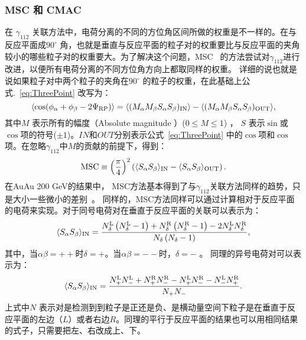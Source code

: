 \subsubsection{MSC 和 CMAC}
在 $\gamma_{112}$ 关联方法中，电荷分离的不同的方位角区间所做的权重是不一样的。在与反应平面成$90^\circ$ 角，也就是垂直与反应平面的粒子对的权重要比与反应平面的夹角较小的哪些粒子对的权重要大。为了解决这个问题，MSC~\cite{STAR3} 的方法尝试对$\gamma_{112}$进行改进，以便所有电荷分离的不同方位角方向上都取同样的权重。
详细的说也就是说如果粒子对中两个粒子的夹角在$90^\circ$ 的粒子的权重，在此基础上公式.~\ref{eq:ThreePoint} 改写为：
\begin{equation}
\langle \cos(\phi_{\alpha}+\phi_{\beta}-2{\rm \Psi_{RP}}) \rangle =
\langle (M_{\alpha}M_{\beta}S_{\alpha}S_{\beta})_{\rm IN} \rangle -
\langle (M_{\alpha}M_{\beta}S_{\alpha}S_{\beta})_{\rm OUT} \rangle,
\label{eq:MMSS}    
\end{equation}
其中$M$ 表示所有的幅度（Absolute magnitude ）($0\leq M \leq 1$) ，  $S$ 表示$\sin$或$\cos$项的符号($\pm 1$)。$IN$和$OUT$分别表示公式~\ref{eq:ThreePoint} 中的$\cos$项和$\cos$项。在忽略$\gamma_{112}$中$M$的贡献的前提下，得到：
\begin{equation}
{\rm MSC} \equiv \left(\frac{\pi}{4}\right)^2\left({\langle S_{\alpha}S_{\beta} \rangle_{\rm IN}-\langle S_{\alpha}S_{\beta}\rangle_{\rm OUT}}\right).
\label{eq:msc}    
\end{equation}
在AuAu 200 GeV的结果中， MSC方法基本得到了与$\gamma_{112}$关联方法同样的趋势，只是大小一些微小的差别~\cite{STAR3}。
同样的，MSC方法同样可以通过计算相对于反应平面的电荷来实现。对于同号电荷对在垂直于反应平面的关联可以表示为：
\begin{equation}
\langle S_{\alpha}S_{\beta}\rangle_{\rm IN} =
\frac{N_{\delta}^{\rm L}\left(N_{\delta}^{\rm L}-1\right) + N_{\delta}^{\rm R}\left(N_{\delta}^{\rm R}-1\right) -
  2N_{\delta}^{\rm L}N_{\delta}^{\rm R}}{N_{\delta}\left(N_{\delta}-1\right)},
\label{eq:NetCombosSS}  
\end{equation}
其中，当$\alpha\beta=++$时$\delta=+$。当$\alpha\beta=--$时，$\delta=-$ 。
同理的异号电荷对可以表示为：
\begin{equation}
\langle S_{\alpha}S_{\beta}\rangle_{\rm IN} =
\frac{N_{+}^{\rm L}N_{-}^{\rm L} + N_{+}^{\rm R}N_{-}^{\rm R} -
  N_{+}^{\rm L}N_{-}^{\rm R} - N_{-}^{\rm L}N_{+}^{\rm R}}{N_{+}N_{-}}.
\label{eq:NetCombosOS}
\end{equation}
上式中$N$ 表示对是检测到到粒子是正还是负、是横动量空间下粒子是在垂直于反应平面的左边（$L$）或者右边$R$。同理的平行于反应平面的结果也可以用相同结果的式子，只需要把左、右改成上、下。


